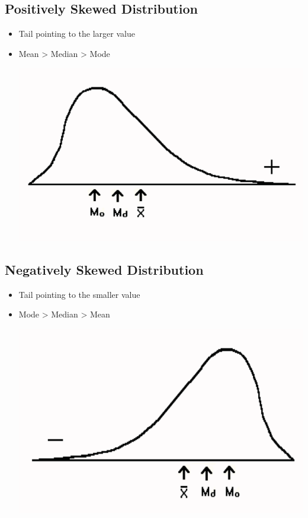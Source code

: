 \documentclass[]{article}
\providecommand{\tightlist}{%
  \setlength{\itemsep}{0pt}\setlength{\parskip}{0pt}}
\begin{document}
\hypertarget{positively-skewed-distribution}{%
\subsection{Positively Skewed
Distribution}\label{positively-skewed-distribution}}

\begin{itemize}
\tightlist
\item
  Tail pointing to the larger value
\item
  Mean \textgreater{} Median \textgreater{} Mode

  \includegraphics[width=0.8\linewidth]{figure/positive-skew}
\end{itemize}

\hypertarget{negatively-skewed-distribution}{%
\subsection{Negatively Skewed
Distribution}\label{negatively-skewed-distribution}}

\begin{itemize}
\tightlist
\item
  Tail pointing to the smaller value
\item
  Mode \textgreater{} Median \textgreater{} Mean

  \includegraphics[width=0.8\linewidth]{figure/negative-skew}
\end{itemize}
\end{document}
